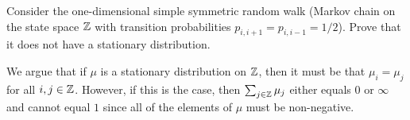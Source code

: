 \begin{problem}{4}
    Consider the one-dimensional simple symmetric random walk (Markov chain on the state space $\mathbb{Z}$ with transition probabilities $p_{i,i+1} = p_{i,i-1} = 1/2$). Prove that it does not have a stationary distribution.
\end{problem}
\begin{solution}
   We argue that if $\mu$ is a stationary distribution on $\mathbb{Z}$, then it must be that $\mu_i = \mu_j$ for all $i,j \in \mathbb{Z}$. However, if this is the case, then $\sum_{j\in\mathbb{Z}} \mu_j$ either equals $0$ or $\infty$ and cannot equal $1$ since all of the elements of $\mu$ must be non-negative.  
\end{solution}

\begin{problem}{5}
\end{problem}
\begin{solution}

\end{solution}